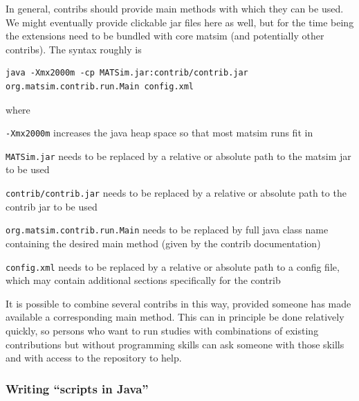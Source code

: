 In general, contribs should provide main methods with which they can be used.  We might eventually provide clickable jar files here as well, but for the time being the extensions need to be bundled with core \acrshort{matsim} (and potentially other contribs).  The syntax roughly is
\begin{lstlisting}
java -Xmx2000m -cp MATSim.jar:contrib/contrib.jar org.matsim.contrib.run.Main config.xml  
\end{lstlisting}
where
\begin{compactitem}
\item \lstinline$-Xmx2000m$ increases the \gls{java} heap space so that most \acrshort{matsim} runs fit in
\item \lstinline$MATSim.jar$ needs to be replaced by a relative or absolute path to the \acrshort{matsim} jar to be used
\item \lstinline$contrib/contrib.jar$ needs to be replaced by a relative or absolute path to the contrib jar to be used
\item \lstinline$org.matsim.contrib.run.Main$ needs to be replaced by full java class name containing the desired main method (given by the contrib documentation)
\item \lstinline$config.xml$ needs to be replaced by a relative or absolute path to a config file, which may contain additional sections specifically for the contrib
\end{compactitem}

It is possible to combine several contribs in this way, provided someone has made available a corresponding main method.  This can in principle be done relatively quickly, so persons who want to run studies with combinations of existing contributions but without programming skills can ask someone with those skills and with access to the repository to help.

\subsubsection{Writing ``scripts in Java''}
\label{sec:writing-scripts-java}

